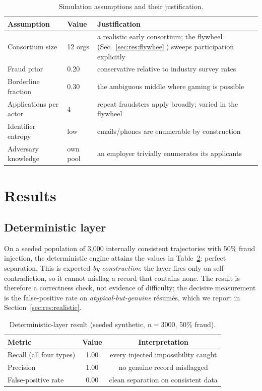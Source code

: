 \documentclass[11pt]{article}
\begin{document}
\begin{table}[t]\centering\small
\caption{Simulation assumptions and their justification.}\label{tab:assumptions}
\begin{tabular}{p{3.6cm}p{2.0cm}p{6.0cm}}
\toprule
Assumption & Value & Justification\\
\midrule
Consortium size & 12 orgs & a realistic early consortium; the flywheel (Sec.~\ref{sec:res:flywheel}) sweeps participation explicitly\\
Fraud prior & 0.20 & conservative relative to industry survey rates~\cite{resumefraud2025}\\
Borderline fraction & 0.30 & the ambiguous middle where gaming is possible\\
Applications per actor & 4 & repeat fraudsters apply broadly; varied in the flywheel\\
Identifier entropy & low & emails/phones are enumerable by construction~\cite{cook2019}\\
Adversary knowledge & own pool & an employer trivially enumerates its applicants\\
\bottomrule
\end{tabular}
\end{table}

\section{Results}\label{sec:results}

\subsection{Deterministic layer}\label{sec:res:det}
On a seeded population of 3{,}000 internally consistent trajectories with 50\%
fraud injection, the deterministic engine attains the values in
Table~\ref{tab:det}: perfect separation. This is expected \emph{by construction}:
the layer fires only on self-contradiction, so it cannot misflag a record that
contains none. The result is therefore a correctness check, not evidence of
difficulty; the decisive measurement is the false-positive rate on
\emph{atypical-but-genuine} r\'esum\'es, which we report in
Section~\ref{sec:res:realistic}.

\begin{table}[t]\centering\small
\caption{Deterministic-layer result (seeded synthetic, $n=3000$, 50\% fraud).}\label{tab:det}
\begin{tabular}{lcc}
\toprule
Metric & Value & Interpretation \\
\midrule
Recall (all four types) & 1.00 & every injected impossibility caught \\
Precision & 1.00 & no genuine record misflagged \\
False-positive rate & 0.00 & clean separation on consistent data \\
\bottomrule
\end{tabular}
\end{table}
\end{document}
